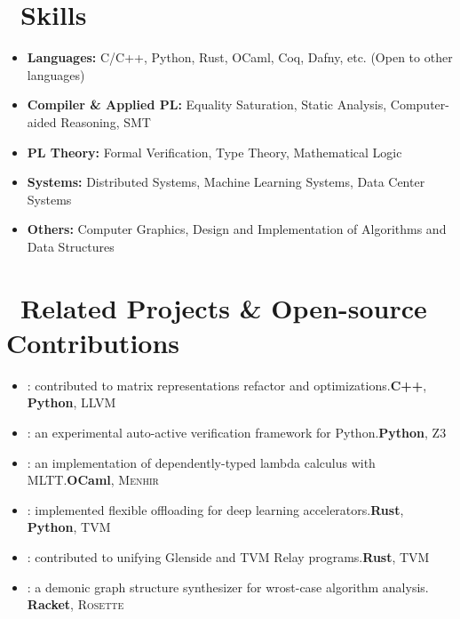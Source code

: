 \documentclass{resume}
\begin{document}
\section{\faCog\ Skills}
\begin{itemize}
    \item \textbf{Languages:} C/C++, Python, Rust, OCaml, Coq, Dafny, etc. (Open to other languages)
    \item \textbf{Compiler \& Applied PL:} Equality Saturation, Static Analysis, Computer-aided Reasoning, SMT
    \item \textbf{PL Theory:} Formal Verification, Type Theory, Mathematical Logic
    \item \textbf{Systems:} Distributed Systems, Machine Learning Systems, Data Center Systems
    \item \textbf{Others:} Computer Graphics, Design and Implementation of Algorithms and Data Structures
\end{itemize}

\section{\faGithub\ Related Projects \& Open-source Contributions}
\begin{itemize}
    \item {}: contributed to matrix representations refactor and optimizations.\hfill \textbf{C++}, \textbf{Python}, \textsc{LLVM}
    \item {}: an experimental auto-active verification framework for Python.\hfill \textbf{Python}, \textsc{Z3}
    \item {}: an implementation of dependently-typed lambda calculus with MLTT.\hfill \textbf{OCaml}, \textsc{Menhir}
    \item {}: implemented flexible offloading for deep learning accelerators.\hfill \textbf{Rust}, \textbf{Python}, \textsc{TVM}
    \item {}: contributed to unifying Glenside and TVM Relay programs.\hfill \textbf{Rust}, \textsc{TVM}
    \item {}: a demonic graph structure synthesizer for wrost-case algorithm analysis. \hfill \textbf{Racket}, \textsc{Rosette}
\end{itemize}
\end{document}
